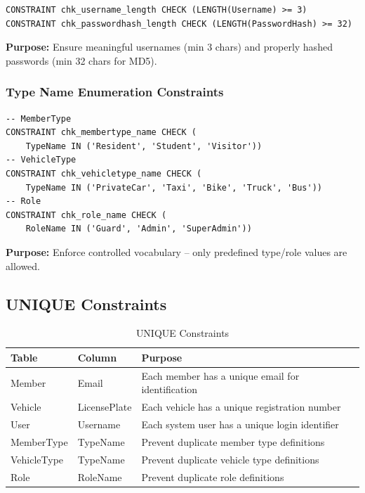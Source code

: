 \documentclass[a4paper, 12pt]{article}
\begin{document}
\begin{lstlisting}[style=sqlstyle, caption={User Table Constraints}, label={lst:chk-user}]
CONSTRAINT chk_username_length CHECK (LENGTH(Username) >= 3)
CONSTRAINT chk_passwordhash_length CHECK (LENGTH(PasswordHash) >= 32)
\end{lstlisting}

\textbf{Purpose:} Ensure meaningful usernames (min 3 chars) and properly hashed passwords (min 32 chars for MD5).

\subsubsection{Type Name Enumeration Constraints}

\begin{lstlisting}[style=sqlstyle, caption={Enumeration CHECK Constraints}, label={lst:chk-enum}]
-- MemberType
CONSTRAINT chk_membertype_name CHECK (
    TypeName IN ('Resident', 'Student', 'Visitor'))
-- VehicleType
CONSTRAINT chk_vehicletype_name CHECK (
    TypeName IN ('PrivateCar', 'Taxi', 'Bike', 'Truck', 'Bus'))
-- Role
CONSTRAINT chk_role_name CHECK (
    RoleName IN ('Guard', 'Admin', 'SuperAdmin'))
\end{lstlisting}

\textbf{Purpose:} Enforce controlled vocabulary -- only predefined type/role values are allowed.

\subsection{UNIQUE Constraints}

\begin{table}[H]
\centering
\caption{UNIQUE Constraints}
\label{tab:unique}
\begin{tabularx}{\textwidth}{l l X}
\toprule
\textbf{Table} & \textbf{Column} & \textbf{Purpose} \\
\midrule
Member & Email & Each member has a unique email for identification \\
Vehicle & LicensePlate & Each vehicle has a unique registration number \\
User & Username & Each system user has a unique login identifier \\
MemberType & TypeName & Prevent duplicate member type definitions \\
VehicleType & TypeName & Prevent duplicate vehicle type definitions \\
Role & RoleName & Prevent duplicate role definitions \\
\bottomrule
\end{tabularx}
\end{table}
\end{document}
